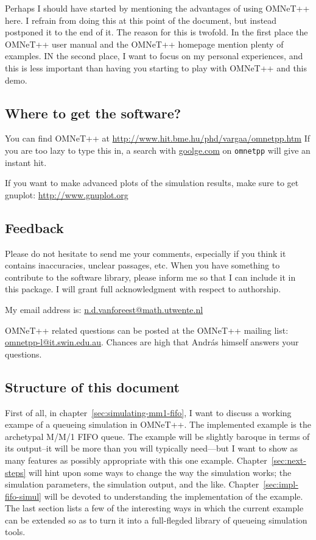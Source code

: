 \documentclass[a4paper]{article}
\begin{document}
Perhaps I should have started by mentioning the advantages of using
OMNeT++ here. I refrain from doing this at this point of the document,
but instead postponed it to the end of it. The reason for this is
twofold. In the first place the OMNeT++ user manual and the OMNeT++
homepage mention plenty of examples. IN the second place, I want to
focus on my personal experiences, and this is less important than
having you starting to play with OMNeT++ and this demo.

\subsection{Where to get the software?}
\label{sec:where-get-software}
You can find OMNeT++ at
\url{http://www.hit.bme.hu/phd/vargaa/omnetpp.htm} If you are too lazy
to type this in, a search with \url{goolge.com} on \texttt{omnetpp}
will give an instant hit.

\noindent
If you want to make advanced plots of the simulation results, make
sure to get gnuplot:
\url{http://www.gnuplot.org}

\subsection{Feedback}
\label{sec:feedback}
Please do not hesitate to send me your comments, especially if you
think it contains inaccuracies, unclear passages, etc. When you have
something to contribute to the software library, please inform me so
that I can include it in this package. I will grant full
acknowledgment with respect to authorship.

My email address is: \url{n.d.vanforeest@math.utwente.nl}

OMNeT++ related questions can be posted at the OMNeT++ mailing list:
\url{omnetpp-l@it.swin.edu.au}. Chances are high that Andr{\'a}s himself
answers your questions.


\subsection{Structure of this document}
\label{sec:struct-this-docum}
First of all, in chapter~\ref{sec:simulating-mm1-fifo}, I want to
discuss a working exampe of a queueing simulation in OMNeT++.  The
implemented example is the archetypal M/M/1 FIFO queue. The example
will be slightly baroque in terms of its output--it will be more than
you will typically need---but I want to show as many features as
possibly appropriate with this one example.
Chapter~\ref{sec:next-steps} will hint upon some ways to change the
way the simulation works; the simulation parameters, the simulation
output, and the like.  Chapter~\ref{sec:impl-fifo-simul} will be
devoted to understanding the implementation of the example.  The last
section lists a few of the interesting ways in which the current
example can be extended so as to turn it into a full-flegded library
of queueing simulation tools.
\end{document}
